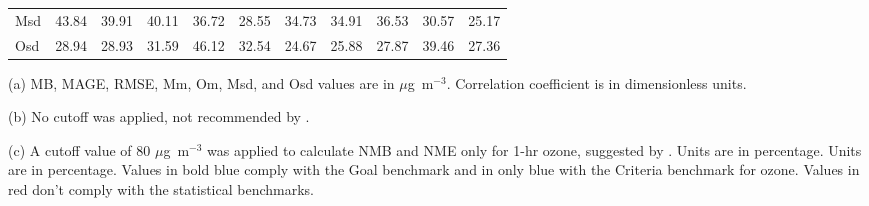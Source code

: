 \begin{table}
\begin{threeparttable}[b]
\begin{tabular}{lrrrrrrrrrr}
Msd  &     43.84 &     39.91 &    40.11 &   36.72 &    28.55 &     34.73 &     34.91 &    36.53 &   30.57 &    25.17 \\
Osd  &     28.94 &     28.93 &    31.59 &   46.12 &    32.54 &     24.67 &     25.88 &    27.87 &   39.46 &    27.36 \\
\bottomrule
\end{tabular}
\begin{tablenotes}
{\scriptsize
	\item[(a)] MB, MAGE, RMSE, Mm, Om, Msd, and Osd values are in $\mu$g~m$^{-3}$. Correlation coefficient is in dimensionless units.
	\item[(b)] No cutoff was applied, not recommended by \citet{Emery2017}.
	\item[(c)] A cutoff value of 80 $\mu$g~m$^{-3}$ was applied to calculate NMB and NME only for 1-hr ozone, suggested by \citet{Emery2017}. Units are in percentage. Units are in percentage. Values in bold blue comply with the Goal benchmark and in only blue with the Criteria benchmark for ozone. Values in red don't comply with the statistical benchmarks.}
\end{tablenotes}
\end{threeparttable}
\end{table}


